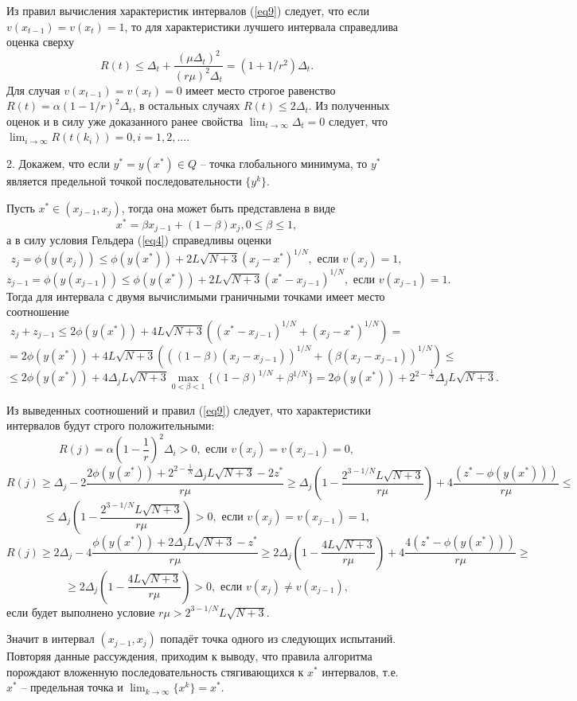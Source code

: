 \documentclass[10pt,a4paper]{book}
\begin{document}
Из правил вычисления характеристик интервалов (\ref{eq9}) следует, что если $v(x_{t-1}) = v(x_t) = 1$, то для характеристики лучшего интервала справедлива оценка сверху
\[
R(t) \leq \Delta_t + \frac{(\mu \Delta_t)^2}{(r\mu)^2 \Delta_t} = (1+1/r^2) \Delta_t.
\]
Для случая $v(x_{t-1}) = v(x_t) = 0$ имеет место строгое равенство $R(t) = \alpha (1-1/r)^2\Delta_t$, в остальных случаях $R(t) \leq 2\Delta_t$. Из полученных оценок и в силу уже доказанного ранее свойства $\lim_{t \to \infty}{\Delta_t} = 0$ следует, что $\lim_{i \to \infty}{R(t(k_i))}=0, i = 1, 2, ...$.

2. Докажем, что если $y^* = y(x^*) \in Q$ -- точка глобального минимума, то $y^*$ является предельной точкой последовательности $\{y^k\}$.

Пусть $x^* \in (x_{j-1}, x_{j})$, тогда она может быть представлена в виде
\[
x^* = \beta x_{j-1}+(1-\beta)x_j, 0 \leq \beta \leq 1,
\]
а в силу условия Гельдера (\ref{eq4}) справедливы оценки
\[
z_j=\phi(y(x_j)) \leq \phi(y(x^*)) + 2L\sqrt{N+3}(x_j - x^*)^{1/N}, \text{ если } v(x_j) = 1,
\]
\[
z_{j-1}=\phi(y(x_{j-1})) \leq \phi(y(x^*)) + 2L\sqrt{N+3}(x^* - x_{j-1})^{1/N},\text{ если } v(x_{j - 1}) = 1.
\]
Тогда для интервала с двумя вычислимыми граничными точками имеет место соотношение
\[
z_j+z_{j-1} \leq 2\phi(y(x^*)) + 4L\sqrt{N+3}((x^* - x_{j-1})^{1/N}+(x_j-x^*)^{1/N}) =
\]
\[
= 2\phi(y(x^*)) + 4L\sqrt{N+3}(((1-\beta)(x_j-x_{j-1}))^{1/N}+(\beta (x_j-x_{j-1}))^{1/N}) \leq
\]
\[
\leq 2\phi(y(x^*)) + 4\Delta_j L\sqrt{N+3}\max_{0< \beta < 1}{\{(1-\beta)^{1/N}+\beta^{1/N}\}} = 2\phi(y(x^*)) + 2^{2-\frac{1}{N}}\Delta_j L\sqrt{N+3}.
\]

Из выведенных соотношений и правил (\ref{eq9}) следует, что характеристики интервалов будут строго положительными:
\[
R(j) =\alpha \left(1-\frac{1}{r}\right)^2\Delta_i>0, \text{ если } v(x_j) = v(x_{j-1}) = 0,
\]
\[
R(j) \geq \Delta_j-2\frac{2\phi(y(x^*)) + 2^{2-\frac{1}{N}}\Delta_j L\sqrt{N+3}-2z^*}{r\mu} \geq \Delta_j(1-\frac{2^{3-1/N}L\sqrt{N+3}}{r\mu}) + 4\frac{(z^*-\phi(y(x^*)))}{r\mu} \leq
\]
\[
\leq \Delta_j(1-\frac{2^{3-1/N}L\sqrt{N+3}}{r\mu})>0, \text{ если } v(x_j) = v(x_{j-1}) = 1,
\]
\[
R(j) \geq 2\Delta_j-4\frac{\phi(y(x^*))+2\Delta_jL\sqrt{N+3}-z^*}{r\mu} \geq 2\Delta_j(1-\frac{4L\sqrt{N+3}}{r\mu}) + 4\frac{4(z^*-\phi(y(x^*)))}{r\mu}\geq
\]
\[
\geq 2\Delta_j(1-\frac{4L\sqrt{N+3}}{r\mu})>0,\text{ если } v(x_j) \neq v(x_{j-1}),
\]
если будет выполнено условие $r\mu > 2^{3-1/N}L\sqrt{N+3}$.

Значит в интервал $(x_{j-1}, x_{j})$ попадёт точка одного из следующих испытаний. Повторяя данные рассуждения, приходим к выводу, что правила алгоритма порождают вложенную последовательность стягивающихся к $x^*$ интервалов, т.е. $x^*$ -- предельная точка и $\lim_{k \to \infty}{\{x^k\}} = x^*$.
\end{document}
